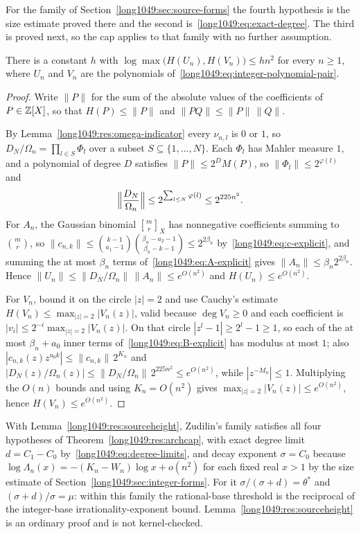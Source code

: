 \documentclass[11pt]{article}
\begin{document}
For the family of Section~\ref{long1049:sec:source-forms} the fourth hypothesis is the
size estimate proved there and the second is~\eqref{long1049:eq:exact-degree}.  The third
is proved next, so the cap applies to that family with no further assumption.

\begin{lemma}\label{long1049:res:sourceheight}
There is a constant $h$ with
$\log\max\bigl(H(U_n),H(V_n)\bigr)\le hn^{2}$ for every $n\ge1$, where $U_n$ and
$V_n$ are the polynomials of~\eqref{long1049:eq:integer-polynomial-pair}.
\end{lemma}

\begin{proof}
Write $\|P\|$ for the sum of the absolute values of the coefficients of
$P\in\mathbb{Z}[X]$, so that $H(P)\le\|P\|$ and $\|PQ\|\le\|P\|\,\|Q\|$.

By Lemma~\ref{long1049:res:omega-indicator} every $\nu_{n,l}$ is $0$ or $1$, so
$D_N/\Omega_n=\prod_{l\in S}\Phi_l$ over a subset $S\subseteq\{1,\dots,N\}$.
Each $\Phi_l$ has Mahler measure $1$, and a polynomial of degree $D$ satisfies
$\|P\|\le2^{D}M(P)$, so $\|\Phi_l\|\le2^{\varphi(l)}$ and
\[
 \Bigl\|\frac{D_N}{\Omega_n}\Bigr\|\le2^{\sum_{l\le N}\varphi(l)}\le2^{225n^{2}} .
\]
For $A_n$, the Gaussian binomial $\genfrac{[}{]}{0pt}{}{m}{r}_X$ has nonnegative
coefficients summing to $\binom{m}{r}$, so
$\|c_{n,k}\|\le\binom{k-1}{a_1-1}\binom{\beta_n-a_2-1}{\beta_n-k-1}\le2^{2\beta_n}$
by~\eqref{long1049:eq:c-explicit}, and summing the at most $\beta_n$ terms
of~\eqref{long1049:eq:A-explicit} gives $\|A_n\|\le\beta_n2^{2\beta_n}$.  Hence
$\|U_n\|\le\|D_N/\Omega_n\|\,\|A_n\|\le e^{O(n^{2})}$ and
$H(U_n)\le e^{O(n^{2})}$.

For $V_n$, bound it on the circle $|z|=2$ and use Cauchy's estimate
$H(V_n)\le\max_{|z|=2}|V_n(z)|$, valid because $\deg V_n\ge0$ and each
coefficient is $|v_i|\le2^{-i}\max_{|z|=2}|V_n(z)|$.  On that circle
$|z^{l}-1|\ge2^{l}-1\ge1$, so each of the at most $\beta_n+a_0$ inner terms
of~\eqref{long1049:eq:B-explicit} has modulus at most $1$; also
$|c_{n,k}(z)z^{a_0k}|\le\|c_{n,k}\|\,2^{K_n}$ and
$|D_N(z)/\Omega_n(z)|\le\|D_N/\Omega_n\|\,2^{225n^{2}}\le e^{O(n^{2})}$, while
$|z^{-M_n}|\le1$.  Multiplying the $O(n)$ bounds and using $K_n=O(n^{2})$ gives
$\max_{|z|=2}|V_n(z)|\le e^{O(n^{2})}$, hence $H(V_n)\le e^{O(n^{2})}$.
\end{proof}

\noindent With Lemma~\ref{long1049:res:sourceheight}, Zudilin's family satisfies all four
hypotheses of Theorem~\ref{long1049:res:archcap}, with exact degree limit $d=C_1-C_0$
by~\eqref{long1049:eq:degree-limits}, and decay exponent $\sigma=C_0$ because
$\log\Lambda_n(x)=-(K_n-W_n)\log x+o(n^{2})$ for each fixed real $x>1$ by the
size estimate of Section~\ref{long1049:sec:integer-forms}.  For it $\sigma/(\sigma+d)=\theta^{*}$ and
$(\sigma+d)/\sigma=\mu$: within this family the rational-base threshold is the
reciprocal of the integer-base irrationality-exponent bound.
Lemma~\ref{long1049:res:sourceheight} is an ordinary proof and is not kernel-checked.
\end{document}
